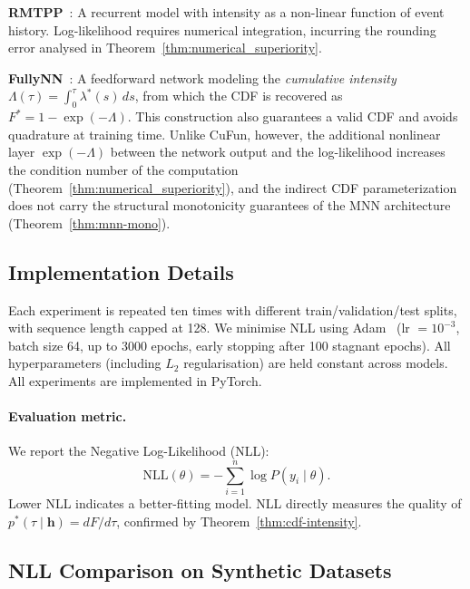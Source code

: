 \noindent\textbf{RMTPP}~\cite{du2016recurrent}:
A recurrent model with intensity as a non-linear function of event history.
Log-likelihood requires numerical integration, incurring the rounding error
analysed in Theorem~\ref{thm:numerical_superiority}.

\noindent\textbf{FullyNN}~\cite{omi2019fully}:
A feedforward network modeling the \emph{cumulative intensity}
$\Lambda(\tau)=\int_0^\tau\lambda^*(s)\,ds$, from which the CDF is recovered
as $F^*=1-\exp(-\Lambda)$.
This construction also guarantees a valid CDF and avoids quadrature at training
time.
Unlike CuFun, however, the additional nonlinear layer $\exp(-\Lambda)$ between
the network output and the log-likelihood increases the condition number of the
computation (Theorem~\ref{thm:numerical_superiority}), and the indirect CDF
parameterization does not carry the structural monotonicity guarantees of the
MNN architecture (Theorem~\ref{thm:mnn-mono}).

\subsection{Implementation Details}

Each experiment is repeated ten times with different train/validation/test
splits, with sequence length capped at 128.
We minimise NLL using Adam~\cite{kingma2014adam} (lr $=10^{-3}$, batch
size 64, up to 3000 epochs, early stopping after 100 stagnant epochs).
All hyperparameters (including $L_2$ regularisation) are held constant
across models. All experiments are implemented in PyTorch.

\paragraph{Evaluation metric.}
We report the Negative Log-Likelihood (NLL):
\begin{equation}
  \mathrm{NLL}(\theta)
  = -\sum_{i=1}^n \log P(y_i\mid\theta).
\end{equation}
Lower NLL indicates a better-fitting model.
NLL directly measures the quality of
$p^*(\tau\mid\boldsymbol{h}) = dF/d\tau$,
confirmed by Theorem~\ref{thm:cdf-intensity}.

\subsection{NLL Comparison on Synthetic Datasets}

